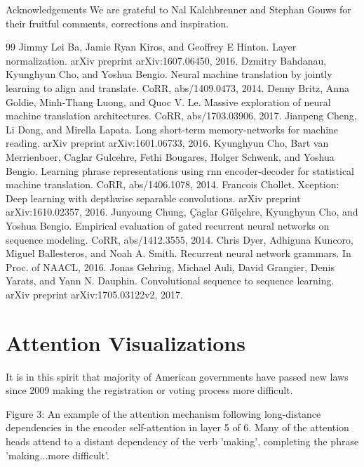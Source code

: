 \documentclass[conference]{IEEEtran}
\begin{document}
Acknowledgements We are grateful to Nal Kalchbrenner and Stephan Gouws for their fruitful comments, corrections and inspiration.

\begin{thebibliography}{99}
 Jimmy Lei Ba, Jamie Ryan Kiros, and Geoffrey E Hinton. Layer normalization. arXiv preprint arXiv:1607.06450, 2016.
 Dzmitry Bahdanau, Kyunghyun Cho, and Yoshua Bengio. Neural machine translation by jointly learning to align and translate. CoRR, abs/1409.0473, 2014.
 Denny Britz, Anna Goldie, Minh-Thang Luong, and Quoc V. Le. Massive exploration of neural machine translation architectures. CoRR, abs/1703.03906, 2017.
 Jianpeng Cheng, Li Dong, and Mirella Lapata. Long short-term memory-networks for machine reading. arXiv preprint arXiv:1601.06733, 2016.
 Kyunghyun Cho, Bart van Merrienboer, Caglar Gulcehre, Fethi Bougares, Holger Schwenk, and Yoshua Bengio. Learning phrase representations using rnn encoder-decoder for statistical machine translation. CoRR, abs/1406.1078, 2014.
 Francois Chollet. Xception: Deep learning with depthwise separable convolutions. arXiv preprint arXiv:1610.02357, 2016.
 Junyoung Chung, Çaglar Gülçehre, Kyunghyun Cho, and Yoshua Bengio. Empirical evaluation of gated recurrent neural networks on sequence modeling. CoRR, abs/1412.3555, 2014.
 Chris Dyer, Adhiguna Kuncoro, Miguel Ballesteros, and Noah A. Smith. Recurrent neural network grammars. In Proc. of NAACL, 2016.
 Jonas Gehring, Michael Auli, David Grangier, Denis Yarats, and Yann N. Dauphin. Convolutional sequence to sequence learning. arXiv preprint arXiv:1705.03122v2, 2017.
 \cite{ref12}
 \cite{ref18}
 \cite{ref20}
 \cite{ref25}
 \cite{ref31}
 \cite{ref37}
 \cite{ref38}
\end{thebibliography}

\section{Attention Visualizations}
It is in this spirit that majority of American governments have passed new laws since 2009 making the registration or voting process more difficult.

Figure 3: An example of the attention mechanism following long-distance dependencies in the encoder self-attention in layer 5 of 6. Many of the attention heads attend to a distant dependency of the verb 'making', completing the phrase 'making...more difficult'. 
\end{document}
